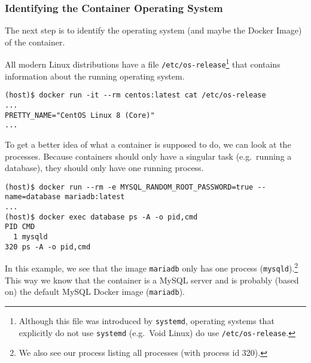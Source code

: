 \subsubsection{Identifying the Container Operating System}\label{subsubsection:idenitfy-container-os}
The next step is to identify the operating system (and maybe the Docker Image) of the container.

All modern Linux distributions have a file \lstinline{/etc/os-release}\footnote{Although this file was introduced by \lstinline{systemd}, operating systems that explicitly do not use \lstinline{systemd} (e.g.\ Void Linux) do use \lstinline{/etc/os-release}.} that contains information about the running operating system.
\begin{lstlisting}[caption={CentOS container \lstinline{/etc/os-release}.},captionpos=b]
(host)$ docker run -it --rm centos:latest cat /etc/os-release
...
PRETTY_NAME="CentOS Linux 8 (Core)"
...
\end{lstlisting}

To get a better idea of what a container is supposed to do, we can look at the processes. Because containers should only have a singular task (e.g.\ running a database), they should only have one running process.

\begin{lstlisting}[caption={A container only has one process.},captionpos=b]
(host)$ docker run --rm -e MYSQL_RANDOM_ROOT_PASSWORD=true --name=database mariadb:latest
...
(host)$ docker exec database ps -A -o pid,cmd
PID CMD
  1 mysqld
320 ps -A -o pid,cmd
\end{lstlisting}

In this example, we see that the image \lstinline{mariadb} only has one process (\lstinline{mysqld}).\footnote{We also see our process listing all processes (with process id 320).} This way we know that the container is a MySQL server and is probably (based on) the default MySQL Docker image (\lstinline{mariadb}).
